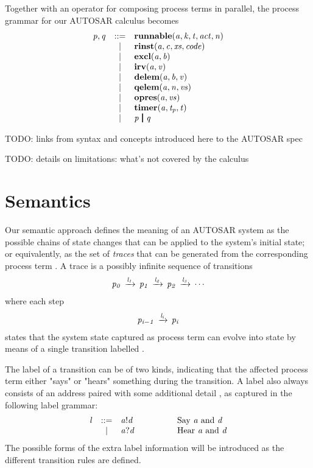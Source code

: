 \documentclass[twocolumn]{article}
\begin{document}
Together with an operator for composing process terms in parallel, the process grammar for our AUTOSAR calculus becomes
\[
\begin{array}{rcll}
  \V{P},\V{Q}   & ::= & \Trunnable{\V{A}}{\V{K}}{\V{T}}{\Act}{\V{N}}    \\
        & |   & \Trinst{\V{A}}{\V{C}}{\Xs}{\Code}       \\
        & |   & \Texcl{\V{A}}{\V{B}}                    \\
        & |   & \Tirv{\V{A}}{\V{V}}                     \\
        & |   & \Tdelem{\V{A}}{\V{B}}{\V{V}}            \\
        & |   & \Tqelem{\V{A}}{\V{N}}{\Vs}              \\
        & |   & \Topres{\V{A}}{\Vs}                     \\
        & |   & \Ttimer{\V{A}}{\V{T_p}}{\V{T}}          \\
        & |   & \Tpar{\V{P}}{\V{Q}}                     \\
\end{array}
\]

TODO: links from syntax and concepts introduced here to the AUTOSAR spec

TODO: details on limitations: what's not covered by the calculus


\section{Semantics}
\label{sec:Sem}

Our semantic approach defines the meaning of an AUTOSAR system as the possible chains of state changes that can be applied to the system's initial state; or equivalently, as the set of \emph{traces} that can be generated from the corresponding process term . A trace is a possibly infinite sequence of transitions
\[
\begin{array}{c}
  \V{P_0} \red{\V{L_1}} \V{P_1} \red{\V{L_2}} \V{P_2} \red{\V{L_3}} \cdots
\end{array}
\]
where each step
\[
\begin{array}{c}
  \V{P_{i-1}} \red{\V{L_i}} \V{P_i}
\end{array}
\]
states that the system state captured as process term  can evolve into state  by means of a single transition labelled .


The label  of a transition can be of two kinds, indicating that the affected process term either "says" or "hears" something during the transition. A label also always consists of an address  paired with some additional detail , as captured in the following label grammar:
\[
\begin{array}{rcll}
  \V{L}     & ::= & \V{A}!\V{D} & \hspace{4em}\text{Say  \V{A} and \V{D}} \\
            & |   & \V{A}?\V{D} & \hspace{4em}\text{Hear \V{A} and \V{D}} \\
\end{array}
\]
The possible forms of the extra label information  will be introduced as the different transition rules are defined.
\end{document}
